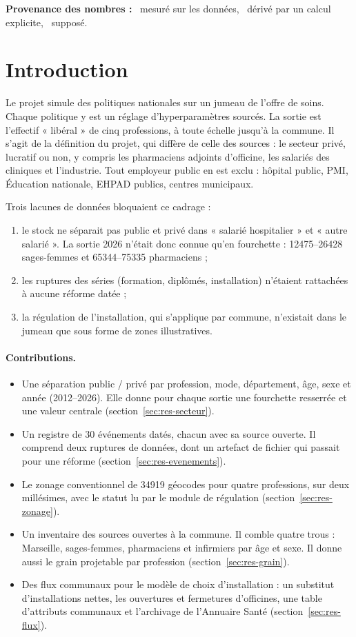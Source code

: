 \documentclass[11pt]{article}
\begin{document}
\noindent\textbf{Provenance des nombres :} \mesure{}~mesuré sur les données, \derive{}~dérivé par un calcul
explicite, \suppose{}~supposé.

\section{Introduction}
Le projet simule des politiques nationales sur un jumeau de l'offre de soins. Chaque politique y est un
réglage d'hyperparamètres sourcés. La sortie est l'effectif « libéral » de cinq professions, à toute échelle
jusqu'à la commune. Il s'agit de la définition du projet, qui diffère de celle des sources : le secteur privé,
lucratif ou non, y compris les pharmaciens adjoints d'officine, les salariés des cliniques et l'industrie. Tout
employeur public en est exclu : hôpital public, PMI, Éducation nationale, EHPAD publics, centres municipaux.

Trois lacunes de données bloquaient ce cadrage :
\begin{enumerate}
  \item le stock ne séparait pas public et privé dans « salarié hospitalier » et « autre salarié ». La sortie
  2026 n'était donc connue qu'en fourchette : \num{12475}--\num{26428} sages-femmes et
  \num{65344}--\num{75335} pharmaciens\mesure{} ;
  \item les ruptures des séries (formation, diplômés, installation) n'étaient rattachées à aucune réforme datée ;
  \item la régulation de l'installation, qui s'applique par commune, n'existait dans le jumeau que sous forme de
  zones illustratives.
\end{enumerate}

\paragraph{Contributions.}
\begin{itemize}
  \item Une séparation public / privé par profession, mode, département, âge, sexe et année (2012--2026). Elle
  donne pour chaque sortie une fourchette resserrée et une valeur centrale (section~\ref{sec:res-secteur}).
  \item Un registre de 30 événements datés, chacun avec sa source ouverte. Il comprend deux ruptures de données,
  dont un artefact de fichier qui passait pour une réforme (section~\ref{sec:res-evenements}).
  \item Le zonage conventionnel de \num{34919} géocodes pour quatre professions, sur deux millésimes, avec le
  statut lu par le module de régulation (section~\ref{sec:res-zonage}).
  \item Un inventaire des sources ouvertes à la commune. Il comble quatre trous : Marseille, sages-femmes,
  pharmaciens et infirmiers par âge et sexe. Il donne aussi le grain projetable par profession
  (section~\ref{sec:res-grain}).
  \item Des flux communaux pour le modèle de choix d'installation : un substitut d'installations nettes, les
  ouvertures et fermetures d'officines, une table d'attributs communaux et l'archivage de l'Annuaire Santé
  (section~\ref{sec:res-flux}).
\end{itemize}
\end{document}
